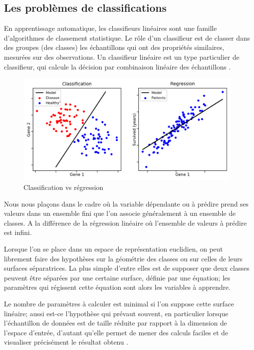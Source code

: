 	
	\subsection{Les problèmes de classifications} \label{sec:classificarion_problem}
		En apprentissage automatique, les classifieurs linéaires sont une famille d'algorithmes de classement statistique. Le rôle d'un classifieur est de classer dans des groupes (des classes) les échantillons qui ont des propriétés similaires, mesurées sur des observations. Un classifieur linéaire est un type particulier de classifieur, qui calcule la décision par combinaison linéaire des échantillons \cite{antoine2018apprentissage}.
		
		\begin{figure}[bth]%
			\centering
			\includegraphics[width=15cm]{images/classification_vs_regression.png}
			\caption{Classification vs régression \cite{ml2008python}
			}
			\label{fig:class_vs_reg}
		\end{figure}
		
		Nous nous plaçons dans le cadre où la variable dépendante ou à prédire prend ses valeurs dans un ensemble fini que l'on associe généralement à un ensemble de classes. A la différence de la régression linéaire où l’ensemble de valeurs à prédire est infini.
		
		Lorsque l'on se place dans un espace de représentation euclidien, on peut librement faire des hypothèses sur la géométrie des classes ou sur celles de leurs surfaces séparatrices. La plus simple d'entre elles est de supposer que deux classes peuvent être séparées par une certaine surface, définie par une équation; les paramètres qui régissent cette équation sont alors les variables à apprendre.
		
		Le nombre de paramètres à calculer est minimal si l'on suppose cette surface linéaire; aussi est-ce l'hypothèse qui prévaut souvent, en particulier lorsque l'échantillon de données est de taille réduite par rapport à la dimension de l'espace d'entrée, d'autant qu'elle permet de mener des calculs faciles et de visualiser précisément le résultat obtenu \cite{sarkar2017practical}.
		
